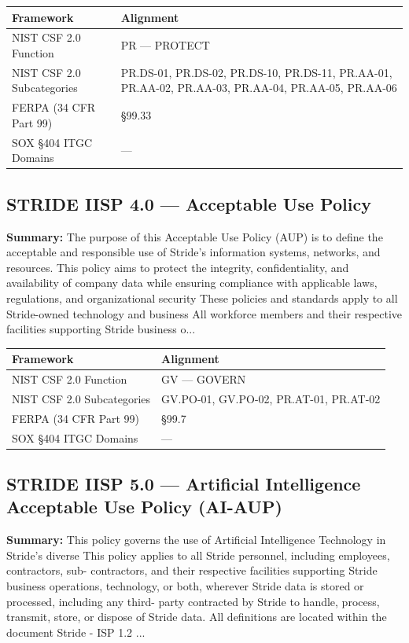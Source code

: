 \documentclass[11pt,landscape]{article}
\begin{document}
\begin{tabularx}{\textwidth}{|p{4cm}|X|}
\hline
\rowcolor{headgray} \textbf{Framework} & \textbf{Alignment} \\
\hline
NIST CSF 2.0 Function & PR --- PROTECT \\
\hline
NIST CSF 2.0 Subcategories & PR.DS-01, PR.DS-02, PR.DS-10, PR.DS-11, PR.AA-01, PR.AA-02, PR.AA-03, PR.AA-04, PR.AA-05, PR.AA-06 \\
\hline
FERPA (34 CFR Part 99) & §99.33 \\
\hline
SOX §404 ITGC Domains & --- \\
\hline
\end{tabularx}


\subsection{\textcolor{strideblue}{STRIDE IISP 4.0} --- Acceptable Use Policy}
\label{pol:IISP40}

\textbf{Summary:} The purpose of this Acceptable Use Policy (AUP) is to define the acceptable and responsible use of Stride’s information systems, networks, and resources. This policy aims to protect the integrity, confidentiality, and availability of company data while ensuring compliance with applicable laws, regulations, and organizational security These policies and standards apply to all Stride-owned technology and business All workforce members and their respective facilities supporting Stride business o...

\begin{tabularx}{\textwidth}{|p{4cm}|X|}
\hline
\rowcolor{headgray} \textbf{Framework} & \textbf{Alignment} \\
\hline
NIST CSF 2.0 Function & GV --- GOVERN \\
\hline
NIST CSF 2.0 Subcategories & GV.PO-01, GV.PO-02, PR.AT-01, PR.AT-02 \\
\hline
FERPA (34 CFR Part 99) & §99.7 \\
\hline
SOX §404 ITGC Domains & --- \\
\hline
\end{tabularx}


\subsection{\textcolor{strideblue}{STRIDE IISP 5.0} --- Artificial Intelligence Acceptable Use Policy (AI-AUP)}
\label{pol:IISP50}

\textbf{Summary:} This policy governs the use of Artificial Intelligence Technology in Stride’s diverse This policy applies to all Stride personnel, including employees, contractors, sub- contractors, and their respective facilities supporting Stride business operations, technology, or both, wherever Stride data is stored or processed, including any third- party contracted by Stride to handle, process, transmit, store, or dispose of Stride data. All definitions are located within the document Stride - ISP 1.2 ...
\end{document}
